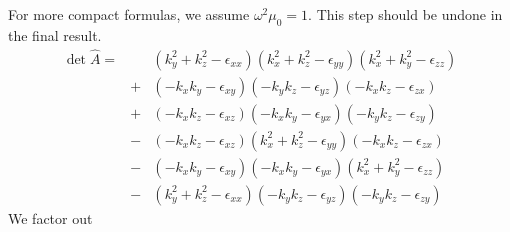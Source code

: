 \documentclass[12pt,a4paper,twoside,openright,BCOR10mm,headsepline,titlepage,abstracton,chapterprefix,final]{scrreprt}
\newcommand\vacuum{0}
\newcommand\wavenumber{k}
\newcommand\vacuumpermeability{\mu_{\vacuum}}
\newcommand\scalarpermittivity{\epsilon}
\begin{document}
For more compact formulas, we assume $\omega^2 \vacuumpermeability=1$. This step should be undone in the final result.
\begin{eqnarray}
 \det \hat{A} =&& 
     (   \wavenumber_y^2 + \wavenumber_z^2 -  \scalarpermittivity_{xx} )
     (   \wavenumber_x^2 + \wavenumber_z^2 -  \scalarpermittivity_{yy} )
     (   \wavenumber_x^2 + \wavenumber_y^2 -  \scalarpermittivity_{zz} )
 \nonumber\\&+&
     ( - \wavenumber_x \wavenumber_y -  \scalarpermittivity_{xy} )
     ( - \wavenumber_y \wavenumber_z -  \scalarpermittivity_{yz} )
     ( - \wavenumber_x \wavenumber_z -  \scalarpermittivity_{zx} )
 \nonumber\\&+&
     ( - \wavenumber_x \wavenumber_z -  \scalarpermittivity_{xz} )
     ( - \wavenumber_x \wavenumber_y -  \scalarpermittivity_{yx} )
     ( - \wavenumber_y \wavenumber_z -  \scalarpermittivity_{zy} )
 \nonumber\\&-&    
     ( - \wavenumber_x \wavenumber_z -  \scalarpermittivity_{xz} )     
     (   \wavenumber_x^2 + \wavenumber_z^2 -  \scalarpermittivity_{yy} )    
     ( - \wavenumber_x \wavenumber_z -  \scalarpermittivity_{zx} )
 \nonumber\\&-&
     ( - \wavenumber_x \wavenumber_y -  \scalarpermittivity_{xy} )
     ( - \wavenumber_x \wavenumber_y -  \scalarpermittivity_{yx} )
     (   \wavenumber_x^2 + \wavenumber_y^2 -  \scalarpermittivity_{zz} )
 \nonumber\\&-&
     (   \wavenumber_y^2 + \wavenumber_z^2 -  \scalarpermittivity_{xx} )
     ( - \wavenumber_y \wavenumber_z -  \scalarpermittivity_{yz} )
     ( - \wavenumber_y \wavenumber_z -  \scalarpermittivity_{zy} )
\end{eqnarray}
We factor out
\end{document}
